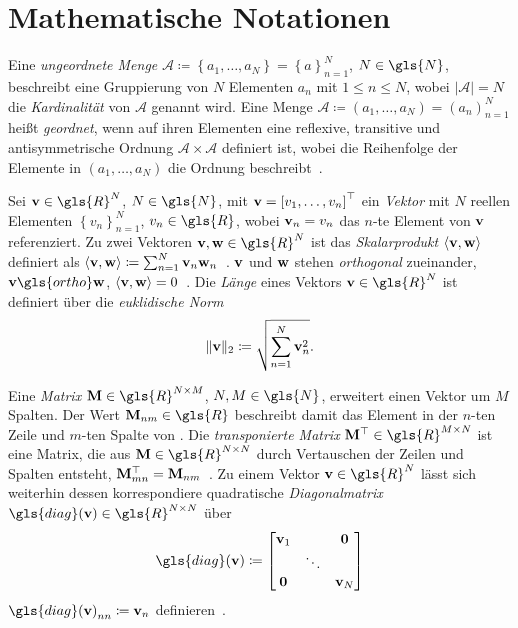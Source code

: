 \section{Mathematische Notationen}
\label{mathematische_notationen}

Eine \emph{ungeordnete Menge} $\mathcal{A} \coloneqq \left\{a_1, \ldots, a_N\right\} = {\left\{a\right\}}_{n=1}^N$, $N \in \gls{N}$, beschreibt eine Gruppierung von $N$ Elementen $a_n$ mit $1 \leq n \leq N$, wobei $\left|\mathcal{A}\right| = N$ die \emph{Kardinalität} von $\mathcal{A}$ genannt wird.
Eine Menge $\mathcal{A} \coloneqq \left(a_1, \ldots, a_N \right) = {\left(a_n\right)}_{n=1}^N$ heißt \emph{geordnet}, wenn auf ihren Elementen eine reflexive, transitive und antisymmetrische Ordnung $\mathcal{A} \times \mathcal{A}$ definiert ist, wobei die Reihenfolge der Elemente in $\left(a_1, \ldots, a_N\right)$ die Ordnung beschreibt~\cite{linear}.

Sei $\ve{v} \in \gls{R}^N$, $N \in \gls{N}$, mit $\ve{v} = {\left[v_1, \ldots, v_n \right]}^{\top}$ ein \emph{Vektor} mit $N$ reellen Elementen ${\left\{v_n\right\}}_{n=1}^N$, $v_n \in \gls{R}$, wobei $\mathbf{v}_n = v_n$ das $n$-te Element von $\mathbf{v}$ referenziert.
Zu zwei Vektoren $\ve{v}, \ve{w} \in \gls{R}^N$ ist das \emph{Skalarprodukt} $\left\langle \ve{v}, \ve{w} \right\rangle$ definiert als $\left\langle \ve{v}, \ve{w}\right\rangle \coloneqq \sum_{n=1}^N \ve{v}_n \ve{w}_n$~\cite{linear}.
$\mathbf{v}$ und $\mathbf{w}$ stehen \emph{orthogonal} zueinander, \dhe{} $\ve{v} \gls{ortho} \ve{w}$, \gdw{} $\left\langle \ve{v}, \ve{w} \right\rangle = 0$~\cite{linear}.
Die \emph{Länge} eines Vektors $\ve{v} \in \gls{R}^N$ ist definiert über die \emph{euklidische Norm}
\begin{equation*}
  \left\| \ve{v} \right\|_2 \coloneqq \sqrt{\sum_{n=1}^N \ve{v}_n^2}.
\end{equation*}

Eine \emph{Matrix} $\ma{M} \in \gls{R}^{N \times M}$, $N, M \in \gls{N}$, erweitert einen Vektor um $M$ Spalten.
Der Wert $\ma{M}_{nm} \in \gls{R}$ beschreibt damit das Element in der $n$-ten Zeile und $m$-ten Spalte von .
Die \emph{transponierte Matrix} $\ma{M}^{\top} \in \gls{R}^{M \times N}$ ist eine Matrix, die aus $\ma{M} \in \gls{R}^{N \times N}$ durch Vertauschen der Zeilen und Spalten entsteht, \dhe{} $\mathbf{M}^{\top}_{mn} = \mathbf{M}_{nm}$~\cite{linear}.
Zu einem Vektor $\ve{v} \in \gls{R}^{N}$ lässt sich weiterhin dessen korrespondiere quadratische \emph{Diagonalmatrix} $\gls{diag}\left(\ve{v}\right) \in \gls{R}^{N \times N}$
über
\begin{equation*}
  \gls{diag}\left(\ve{v}\right) \coloneqq \begin{bmatrix}
  \ve{v}_1 & & \ve{0}\\
  & \ddots & \\
  \ve{0} & & \ve{v}_N
  \end{bmatrix}
\end{equation*}
\bzw{} ${\gls{diag}\left(\ve{v}\right)}_{nn} \coloneqq \ve{v}_n$ definieren~\cite{Defferrard}.

